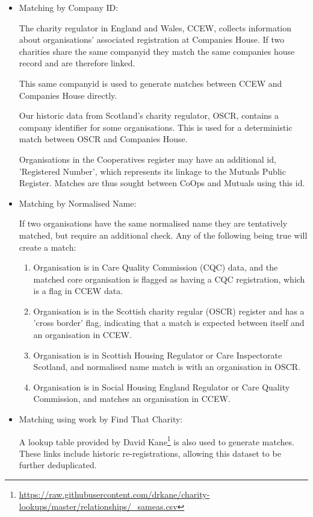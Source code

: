 \documentclass{article}
\begin{document}
\begin{itemize}
\item Matching by Company ID:

The charity regulator in England and Wales, CCEW, collects information about organisations' associated registration at Companies House. 
If two charities share the same companyid they match the same companies house record and are therefore linked.

This same companyid is used to generate matches between CCEW and Companies House directly.

Our historic data from Scotland's charity regulator, OSCR, contains a company identifier for some organisations. This is used
for a deterministic match between OSCR and Companies House.

Organisations in the Cooperatives register may have an additional id, 'Registered Number', which represents its linkage to 
the Mutuals Public Register. Matches are thus sought between CoOps and Mutuals using this id.



\item Matching by Normalised Name:

If two organisations have the same normalised name they are tentatively matched, but require an additional check. 
Any of the following being true will create a match:

  \begin{enumerate}

  \item Organisation is in Care Quality Commission (CQC) data, and the matched core organisation is flagged as having a CQC registration, 
  which is a flag in CCEW data.
  \item Organisation is in the Scottish charity regular (OSCR) register and has a 'cross border' flag, 
  indicating that a match is expected between itself and an organisation in CCEW.
  \item Organisation is in Scottish Housing Regulator or Care Inspectorate Scotland, and normalised name match is with an organisation in OSCR.
  \item Organisation is in Social Housing England Regulator or Care Quality Commission, and matches an organisation in CCEW.
  \end{enumerate}


\item Matching using work by Find That Charity:

A lookup table provided by David Kane\footnote{\url{https://raw.githubusercontent.com/drkane/charity-lookups/master/relationships/_sameas.csv}} is also used to generate matches. 
These links include historic re-registrations, allowing
this dataset to be further deduplicated. 
\end{itemize}
\end{document}
